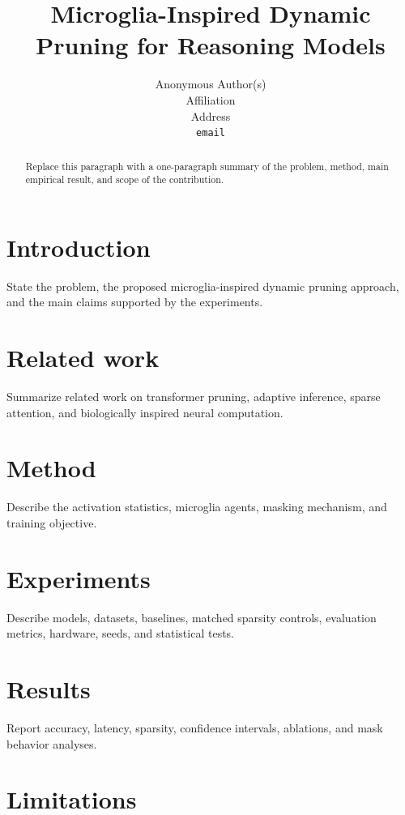 \documentclass{article}
\title{Microglia-Inspired Dynamic Pruning for Reasoning Models}
\author{%
  Anonymous Author(s) \\
  Affiliation \\
  Address \\
  \texttt{email} \\
}
\begin{document}
\maketitle

\begin{abstract}
  Replace this paragraph with a one-paragraph summary of the problem, method,
  main empirical result, and scope of the contribution.
\end{abstract}

\section{Introduction}

State the problem, the proposed microglia-inspired dynamic pruning approach, and
the main claims supported by the experiments.

\section{Related work}

Summarize related work on transformer pruning, adaptive inference, sparse
attention, and biologically inspired neural computation.

\section{Method}

Describe the activation statistics, microglia agents, masking mechanism, and
training objective.

\section{Experiments}

Describe models, datasets, baselines, matched sparsity controls, evaluation
metrics, hardware, seeds, and statistical tests.

\section{Results}

Report accuracy, latency, sparsity, confidence intervals, ablations, and mask
behavior analyses.

\section{Limitations}
\end{document}
